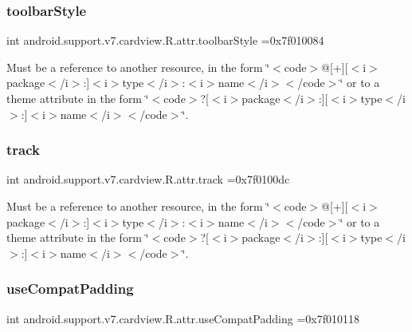 \subsubsection{\texorpdfstring{toolbar\+Style}{toolbarStyle}}
{\footnotesize\ttfamily int android.\+support.\+v7.\+cardview.\+R.\+attr.\+toolbar\+Style =0x7f010084\hspace{0.3cm}{\ttfamily [static]}}

Must be a reference to another resource, in the form \char`\"{}$<$code$>$@\mbox{[}+\mbox{]}\mbox{[}$<$i$>$package$<$/i$>$\+:\mbox{]}$<$i$>$type$<$/i$>$\+:$<$i$>$name$<$/i$>$$<$/code$>$\char`\"{} or to a theme attribute in the form \char`\"{}$<$code$>$?\mbox{[}$<$i$>$package$<$/i$>$\+:\mbox{]}\mbox{[}$<$i$>$type$<$/i$>$\+:\mbox{]}$<$i$>$name$<$/i$>$$<$/code$>$\char`\"{}. \mbox{\label{classandroid_1_1support_1_1v7_1_1cardview_1_1R_1_1attr_a4646bbcc651a7caae0d2a11b80495257}} 
\subsubsection{\texorpdfstring{track}{track}}
{\footnotesize\ttfamily int android.\+support.\+v7.\+cardview.\+R.\+attr.\+track =0x7f0100dc\hspace{0.3cm}{\ttfamily [static]}}

Must be a reference to another resource, in the form \char`\"{}$<$code$>$@\mbox{[}+\mbox{]}\mbox{[}$<$i$>$package$<$/i$>$\+:\mbox{]}$<$i$>$type$<$/i$>$\+:$<$i$>$name$<$/i$>$$<$/code$>$\char`\"{} or to a theme attribute in the form \char`\"{}$<$code$>$?\mbox{[}$<$i$>$package$<$/i$>$\+:\mbox{]}\mbox{[}$<$i$>$type$<$/i$>$\+:\mbox{]}$<$i$>$name$<$/i$>$$<$/code$>$\char`\"{}. \mbox{\label{classandroid_1_1support_1_1v7_1_1cardview_1_1R_1_1attr_a6af56f642b192d4d5ea22a6b22350cd3}} 
\subsubsection{\texorpdfstring{use\+Compat\+Padding}{useCompatPadding}}
{\footnotesize\ttfamily int android.\+support.\+v7.\+cardview.\+R.\+attr.\+use\+Compat\+Padding =0x7f010118\hspace{0.3cm}{\ttfamily [static]}}

